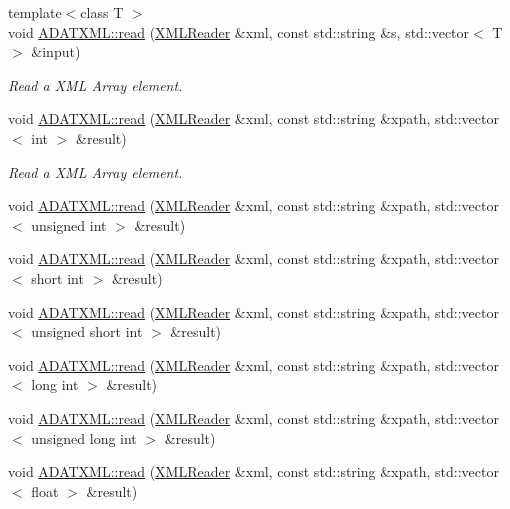 \begin{DoxyCompactItemize}
\item 
{\footnotesize template$<$class T $>$ }\\void \mbox{\hyperlink{group__io_gae58a41d3a914bc8eba546ada945fa97f}{A\+D\+A\+T\+X\+M\+L\+::read}} (\mbox{\hyperlink{classADATXML_1_1XMLReader}{X\+M\+L\+Reader}} \&xml, const std\+::string \&s, std\+::vector$<$ T $>$ \&input)
\begin{DoxyCompactList}\small\item\em Read a X\+ML Array element. \end{DoxyCompactList}\item 
void \mbox{\hyperlink{group__io_gaba3ec8cd866164ea8bdc810edeaf8210}{A\+D\+A\+T\+X\+M\+L\+::read}} (\mbox{\hyperlink{classADATXML_1_1XMLReader}{X\+M\+L\+Reader}} \&xml, const std\+::string \&xpath, std\+::vector$<$ int $>$ \&result)
\begin{DoxyCompactList}\small\item\em Read a X\+ML Array element. \end{DoxyCompactList}\item 
void \mbox{\hyperlink{group__io_ga745a0160808dcca1ec6805d77979bfcc}{A\+D\+A\+T\+X\+M\+L\+::read}} (\mbox{\hyperlink{classADATXML_1_1XMLReader}{X\+M\+L\+Reader}} \&xml, const std\+::string \&xpath, std\+::vector$<$ unsigned int $>$ \&result)
\item 
void \mbox{\hyperlink{group__io_ga5ca3f42dfcdc536156476e7f6d6db61c}{A\+D\+A\+T\+X\+M\+L\+::read}} (\mbox{\hyperlink{classADATXML_1_1XMLReader}{X\+M\+L\+Reader}} \&xml, const std\+::string \&xpath, std\+::vector$<$ short int $>$ \&result)
\item 
void \mbox{\hyperlink{group__io_gacd64b080900323aa538c91b95c83248d}{A\+D\+A\+T\+X\+M\+L\+::read}} (\mbox{\hyperlink{classADATXML_1_1XMLReader}{X\+M\+L\+Reader}} \&xml, const std\+::string \&xpath, std\+::vector$<$ unsigned short int $>$ \&result)
\item 
void \mbox{\hyperlink{group__io_gaad4f8586d1c41ae7f0c32a40754623f5}{A\+D\+A\+T\+X\+M\+L\+::read}} (\mbox{\hyperlink{classADATXML_1_1XMLReader}{X\+M\+L\+Reader}} \&xml, const std\+::string \&xpath, std\+::vector$<$ long int $>$ \&result)
\item 
void \mbox{\hyperlink{group__io_ga04a1d8c6fa265cdf5824019b4f94844f}{A\+D\+A\+T\+X\+M\+L\+::read}} (\mbox{\hyperlink{classADATXML_1_1XMLReader}{X\+M\+L\+Reader}} \&xml, const std\+::string \&xpath, std\+::vector$<$ unsigned long int $>$ \&result)
\item 
void \mbox{\hyperlink{group__io_ga161a35ac40c7f85342a454fbc17e2dad}{A\+D\+A\+T\+X\+M\+L\+::read}} (\mbox{\hyperlink{classADATXML_1_1XMLReader}{X\+M\+L\+Reader}} \&xml, const std\+::string \&xpath, std\+::vector$<$ float $>$ \&result)

\end{DoxyCompactItemize}
